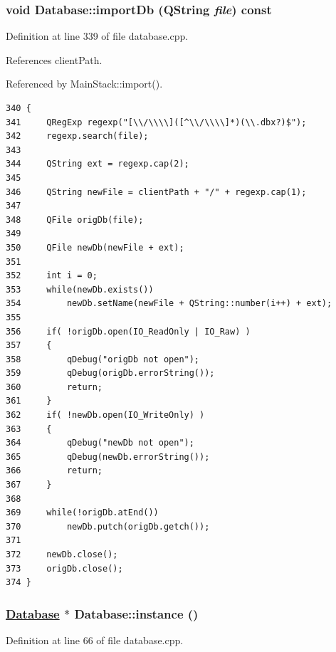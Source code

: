 \hypertarget{classDatabase_a8}{
\subsubsection[importDb]{\setlength{\rightskip}{0pt plus 5cm}void Database::import\-Db (QString {\em file}) const}}
\label{classDatabase_a8}


Definition at line 339 of file database.cpp.

References client\-Path.

Referenced by Main\-Stack::import().

\footnotesize\begin{verbatim}340 {
341     QRegExp regexp("[\\/\\\\]([^\\/\\\\]*)(\\.dbx?)$");
342     regexp.search(file);
343 
344     QString ext = regexp.cap(2);
345 
346     QString newFile = clientPath + "/" + regexp.cap(1);
347 
348     QFile origDb(file);
349 
350     QFile newDb(newFile + ext);
351 
352     int i = 0;
353     while(newDb.exists())
354         newDb.setName(newFile + QString::number(i++) + ext);
355 
356     if( !origDb.open(IO_ReadOnly | IO_Raw) )
357     {
358         qDebug("origDb not open");
359         qDebug(origDb.errorString());
360         return;
361     }
362     if( !newDb.open(IO_WriteOnly) )
363     {
364         qDebug("newDb not open");
365         qDebug(newDb.errorString());
366         return;
367     }
368     
369     while(!origDb.atEnd())
370         newDb.putch(origDb.getch());
371     
372     newDb.close();
373     origDb.close();
374 }
\end{verbatim}\normalsize 


\hypertarget{classDatabase_e0}{
\subsubsection[instance]{\setlength{\rightskip}{0pt plus 5cm}\hyperlink{classDatabase}{Database} $\ast$ Database::instance ()}}
\label{classDatabase_e0}


Definition at line 66 of file database.cpp.

